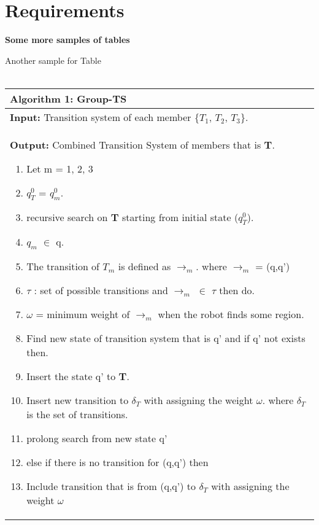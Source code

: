 \section{Requirements}
\newpage
\begin{center}
 \textbf{ Some more samples of tables}
\end{center}
Another sample for Table \\ \\
\begin{tabular}{ |p{12cm}| }
 \hline
  \textbf{Algorithm 1:} Group-TS  \\ \hline
\textbf{ Input:} Transition system of each member \{$T_1$, $T_2$, $T_3$\}. \\
  \textbf{Output:} Combined Transition System of members that is \textbf{T}.
  \begin{enumerate}
    \item Let m = 1, 2, 3
    \item $q^0_T$ = $q^0_m$.
    \item recursive search on \textbf{T} starting from initial state ($q^0_T$).
    \item $q_m$ $\in$ q.
    \item The transition of $T_m$ is defined as $\rightarrow_m$. where $\rightarrow_m$ = (q,q')
    \item $\tau$ : set of possible transitions and $\rightarrow_m$ $\in$ $\tau$ then do.
    \item $\omega$ = minimum weight of $\rightarrow_m$ when the robot finds some region.
    \item Find new state of transition system that is q' and if q' not exists then.
    \item Insert the state q' to \textbf{T}.
    \item Insert new transition to $\delta_T$ with assigning the weight $\omega$. where $\delta_T$ is the set of transitions.
    \item prolong search from new state q'
    \item else if there is no transition for (q,q') then
    \item Include transition that is from (q,q') to $\delta_T$ with assigning the weight $\omega$
  \end{enumerate}
 \\ \hline
\end{tabular}

\vspace{20pt}

